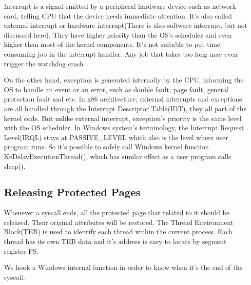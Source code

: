 Interrupt is a signal emitted by a peripheral hardware device such as network card, telling CPU that the device needs immediate attention. It's also called external interrupt or hardware interrupt(There is also software interrupt, but not discussed here). They have higher priority than the OS's scheduler and even higher than most of the kernel components. It's not suitable to put time consuming job in the interrupt handler. Any job that takes too long may even trigger the watchdog crash~\cite{msdnwatchdog}.   

On the other hand, exception is generated internally by the CPU, informing the OS to handle an event or an error, such as double fault, page fault, general protection fault and etc. In x86 architecture, external interrupts and exceptions are all handled through the Interrupt Descriptor Table(IDT), they all part of the kernel code. But unlike external interrupt, exception's priority is the same level with the OS scheduler. In Windows system's terminology, the Interrupt Request Level(IRQL) stays at PASSIVE\_LEVEL which also is the level where user program runs. So it's possible to safely call Windows kernel function KeDelayExecutionThread(), which has similar effect as a user program calls sleep(). 


\subsection{Releasing Protected Pages}

Whenever a syscall ends, all the protected page that related to it should be released. Their original attributes will be restored. The Thread Environment Block(TEB) is used to identify each thread within the current process. Each thread has its own TEB data and it's address is easy to locate by segment register FS. 

We hook a Windows internal function in order to know when it's the end of the syscall. 


